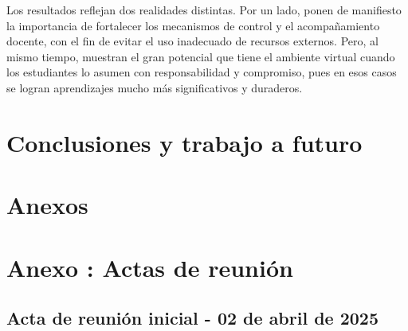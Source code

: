 \documentclass[letter,oneside,12pt,spanish]{report}
\begin{document}
Los resultados reflejan dos realidades distintas. Por un lado, ponen de manifiesto la importancia de fortalecer los mecanismos de control y el acompañamiento docente, con el fin de evitar el uso inadecuado de recursos externos. Pero, al mismo tiempo, muestran el gran potencial que tiene el ambiente virtual cuando los estudiantes lo asumen con responsabilidad y compromiso, pues en esos casos se logran aprendizajes mucho más significativos y duraderos.


\newpage

\chapter{Conclusiones y trabajo a futuro}

\newpage

%
%

\printbibliography

\nocite{poniszewska-maranda, burns-kubernetes, torres-bosch-microservicios, armstrong2015,kubevirtio, docker2023, kubelet-doc, namespace-article}
\newpage

\appendix

\chapter*{Anexos}

\renewcommand{\thechapter}{\arabic{chapter}}

\chapter*{Anexo \thechapter: Actas de reunión}
\label{anexo:actas}

\section*{Acta de reunión inicial - 02 de abril de 2025}
\label{anexo:acta-abril-2025}
\end{document}
